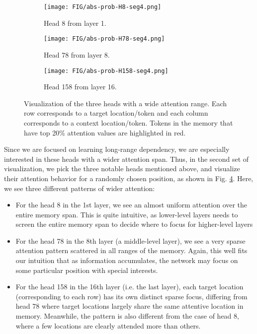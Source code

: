 \documentclass[11pt,a4paper]{article}
\begin{document}
\begin{figure}[!h]
	\begin{subfigure}[b]{\linewidth}
		\texttt{[image: FIG/abs-prob-H8-seg4.png]}
		\caption{Head 8 from layer 1.}
		\label{fig:visattn-8}
	\end{subfigure}
	\begin{subfigure}[b]{\linewidth}
		\texttt{[image: FIG/abs-prob-H78-seg4.png]}
		\caption{Head 78 from layer 8.}
		\label{fig:visattn-78}
	\end{subfigure}
	\begin{subfigure}[b]{\linewidth}
		\texttt{[image: FIG/abs-prob-H158-seg4.png]}
		\caption{Head 158 from layer 16.}
		\label{fig:visattn-158}
	\end{subfigure}
	\caption{Visualization of the three heads with a wide attention range. Each row corresponds to a target location/token and each column corresponds to a context location/token. Tokens in the memory that have top 20\% attention values are highlighted in red.}
	\label{fig:visattn-pick}
\end{figure}
Since we are focused on learning long-range dependency, we are especially interested in these heads with a wider attention span.
Thus, in the second set of visualization, we pick the three notable heads mentioned above, and visualize their attention behavior for a randomly chosen position, as shown in Fig. \ref{fig:visattn-pick}.
Here, we see three different patterns of wider attention:
\begin{itemize}[leftmargin=*]
	\item For the head 8 in the 1st layer, we see an almost uniform attention over the entire memory span. This is quite intuitive, as lower-level layers needs to screen the entire memory span to decide where to focus for higher-level layers
	\item For the head 78 in the 8th layer (a middle-level layer), we see a very sparse attention pattern scattered in all ranges of the memory. Again, this well fits our intuition that as information accumulates, the network may focus on some particular position with special interests.
	\item For the head 158 in the 16th layer (i.e. the last layer), each target location (corresponding to each row) has its own distinct sparse focus, differing from head 78 where target locations largely share the same attentive location in memory. Meanwhile, the pattern is also different from the case of head 8, where a few locations are clearly attended more than others.
\end{itemize}
\end{document}
